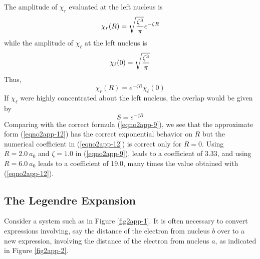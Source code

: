 The amplitude of $\chi_r$ evaluated at the left nucleus is
\begin{equation}
\chi_r (R)  = \sqrt{{\zeta^3 \over \pi}} e^{- \zeta R}
\end{equation}
while the amplitude of $\chi_\ell$ at the left nucleus is
\begin{equation}
\chi_\ell (0) = \sqrt{{\zeta^3 \over \pi}}
\end{equation}
Thus,
\begin{equation}
\chi_r (R) = e^{- \zeta R} \chi_\ell (0)
\end{equation}
If $\chi_\ell$ were highly concentrated about the left nucleus, the 
overlap would be given by
\begin{equation}
S = e^{- \zeta R}
\label{eqno2app-12}
\end{equation}
Comparing with the correct formula (\ref{eqno2app-9}), we see that the
approximate form (\ref{eqno2app-12}) has the correct exponential
behavior on $R$ but the numerical coefficient in (\ref{eqno2app-12})
is correct only for $R = 0$. Using $R = 2.0\ a_0$ and $\zeta = 1.0$ in
(\ref{eqno2app-9}), leads to a coefficient of 3.33, and using $R =
6.0\ a_0$ leads to a coefficient of 19.0, many times the value obtained
with (\ref{eqno2app-12}).

\subsection{The Legendre Expansion}
Consider a system such as in Figure \ref{fig2app-1}. It is often
necessary to convert expressions involving, say the distance of the
electron from nucleus $b$ over to a new expression, involving the
distance of the electron from nucleus $a$, as indicated in Figure
\ref{fig2app-2}.


